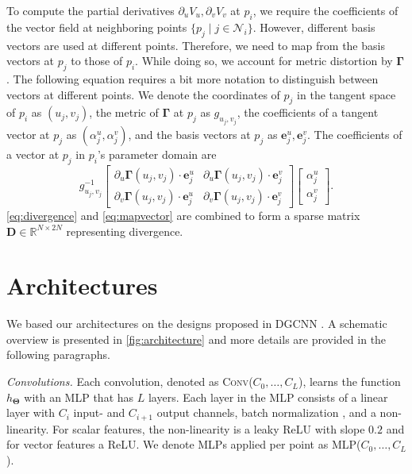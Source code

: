 \documentclass[acmtog, authorversion]{acmart}
\newcommand{\g}{\mathbf{\Gamma}}
\begin{document}
To compute the partial derivatives $\partial_u V_u,\partial_v V_v$ at $p_i$, we require the coefficients of the vector field at neighboring points $\{p_j \mid j \in \mathcal{N}_i\}$. However, different basis vectors are used at different points. Therefore, we need to map from the basis vectors at $p_j$ to those of $p_i$. While doing so, we account for metric distortion by $\g$. The following equation requires a bit more notation to distinguish between vectors at different points. We denote the coordinates of $p_j$ in the tangent space of $p_i$ as $(u_j, v_j)$, the metric of $\g$ at $p_j$ as $g_{u_j, v_j}$, the coefficients of a tangent vector at $p_j$ as $(\alpha_j^u, \alpha_j^v)$, and the basis vectors at $p_j$ as $\mathbf{e}_j^u, \mathbf{e}_j^v$. The coefficients of a vector at $p_j$ in $p_i$'s parameter domain are
\begin{equation}
g^{-1}_{u_j, v_j} \begin{bmatrix}\partial_u\g(u_j, v_j) \cdot \mathbf{e}_j^u & \partial_u\g(u_j, v_j) \cdot \mathbf{e}_j^v \\ \partial_v\g(u_j, v_j) \cdot \mathbf{e}_j^u & \partial_v\g(u_j, v_j) \cdot \mathbf{e}_j^v\end{bmatrix} \begin{bmatrix}\alpha_j^u \\ \alpha_j^v\end{bmatrix}.
    \label{eq:mapvector}
\end{equation}
\autoref{eq:divergence} and \autoref{eq:mapvector} are combined to form a sparse matrix $\mathbf{D} \in \mathbb{R}^{N \times 2N}$ representing divergence.

\section{Architectures}
We based our architectures on the designs proposed in DGCNN \cite{Wang2019}. A schematic overview is presented in \autoref{fig:architecture} and more details are provided in the following paragraphs.

\emph{Convolutions.} Each convolution, denoted as \textsc{Conv}($C_0, \ldots, C_L$), learns the function $h_{\mathbf{\Theta}}$ with an MLP that has $L$ layers. Each layer in the MLP consists of a linear layer with $C_i$ input- and $C_{i+1}$ output channels, batch normalization \cite{Ioffe2015}, and a non-linearity. For scalar features, the non-linearity is a leaky ReLU with slope $0.2$ and for vector features a ReLU. We denote MLPs applied per point as \textsc{MLP}($C_0, \ldots, C_L$).
\end{document}
